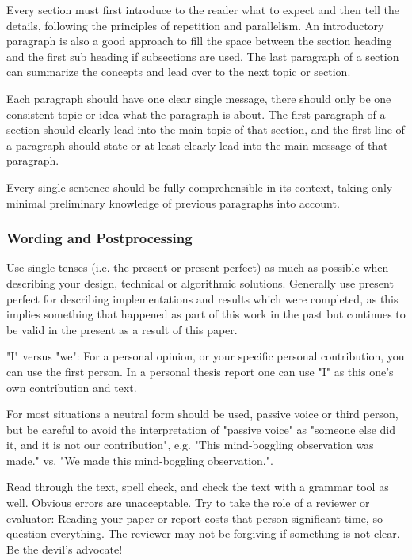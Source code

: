 \documentclass[11pt, a4paper,oneside,chapterprefix=false]{scrbook}
\begin{document}
Every section must first introduce to the reader what to expect and then tell the details, following the principles of repetition and parallelism. An introductory paragraph is also a good approach to fill the space between the section heading and the first sub heading if subsections are used. The last paragraph of a section can summarize the concepts and lead over to the next topic or section.

Each paragraph should have one clear single message, there should only be one consistent topic or idea what the paragraph is about. The first paragraph of a section should clearly lead into the main topic of that section, and the first line of a paragraph should state or at least clearly lead into the main message of that paragraph.

Every single sentence should be fully comprehensible in its context, taking only minimal preliminary knowledge of previous paragraphs into account.

\subsubsection*{Wording and Postprocessing}

Use single tenses (i.e. the present or present perfect) as much as possible when describing your design, technical or algorithmic solutions. Generally use present perfect for describing implementations and results which were completed, as this implies something that happened as part of this work in the past but continues to be valid in the present as a result of this paper.

"I" versus "we": For a personal opinion, or your specific personal contribution, you can use the first person. In a personal thesis report one can use "I" as this one's own contribution and text.

For most situations a neutral form should be used, passive voice or third person, but be careful to avoid the interpretation of "passive voice" as "someone else did it, and it is not our contribution", e.g. "This mind-boggling observation was made." vs. "We made this mind-boggling observation.".

Read through the text, spell check, and check the text with a grammar tool as well. Obvious errors are unacceptable.
Try to take the role of a reviewer or evaluator: Reading your paper or report costs that person significant time, so question everything. The reviewer may not be forgiving if something is not clear. Be the devil's advocate!
\end{document}
